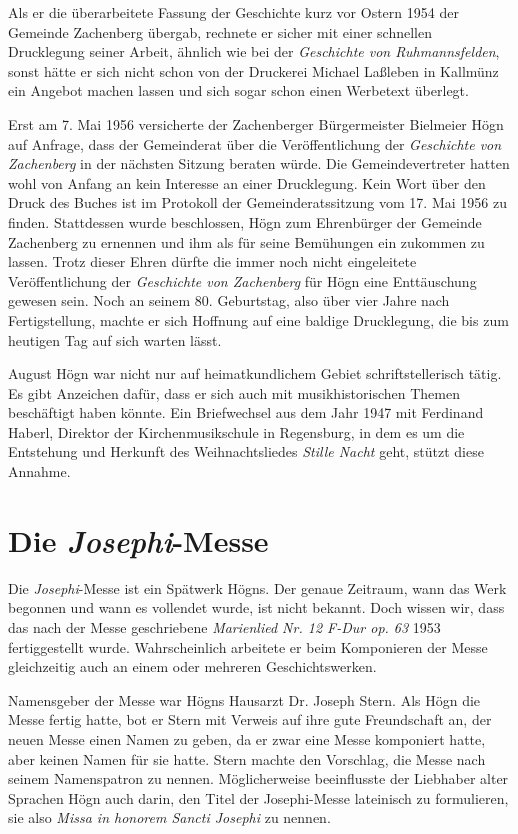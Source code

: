 Als er die überarbeitete Fassung der Geschichte kurz vor Ostern 1954 der
Gemeinde Zachenberg übergab, rechnete er sicher mit einer schnellen
Drucklegung seiner Arbeit, ähnlich wie bei der \textit{Geschichte von
Ruhmannsfelden}, sonst hätte er sich nicht schon von der Druckerei
Michael Laßleben in Kallmünz ein Angebot machen lassen und sich sogar
schon einen Werbetext überlegt.

Erst am 7. Mai 1956 versicherte der Zachenberger Bürgermeister Bielmeier
Högn auf Anfrage, dass der Gemeinderat über die Veröffentlichung der
\textit{Geschichte von Zachenberg} in der nächsten Sitzung beraten
würde. Die Gemeindevertreter hatten wohl von Anfang an kein Interesse
an einer Drucklegung. Kein Wort über den Druck des Buches ist im
Protokoll der Gemeinderatssitzung vom 17. Mai 1956 zu finden.
Stattdessen wurde beschlossen, Högn zum Ehrenbürger der Gemeinde
Zachenberg zu ernennen und ihm als für seine Bemühungen ein  zukommen zu lassen. Trotz dieser Ehren dürfte die
immer noch nicht eingeleitete Veröffentlichung der \textit{Geschichte
von Zachenberg} für Högn eine Enttäuschung gewesen sein. Noch an
seinem 80. Geburtstag, also über vier Jahre nach Fertigstellung, machte
er sich Hoffnung auf eine baldige Drucklegung, die bis zum heutigen Tag
auf sich warten lässt.

August Högn war nicht nur auf heimatkundlichem Gebiet schriftstellerisch
tätig. Es gibt Anzeichen dafür, dass er sich auch mit musikhistorischen
Themen beschäftigt haben könnte. Ein Briefwechsel aus dem Jahr 1947
mit Ferdinand Haberl, Direktor der Kirchenmusikschule in Regensburg,
in dem es um die Entstehung und Herkunft des Weihnachtsliedes
\textit{Stille Nacht} geht, stützt diese Annahme.

\section{Die \textit{Josephi}{}-Messe}

Die \textit{Josephi}{}-Messe ist ein Spätwerk Högns. Der genaue
Zeitraum, wann das Werk begonnen und wann es vollendet wurde, ist nicht
bekannt. Doch wissen wir, dass das nach der Messe geschriebene
\textit{Marienlied Nr. 12 F-Dur op. 63} 1953 fertiggestellt wurde.
Wahrscheinlich arbeitete er beim Komponieren der Messe gleichzeitig
auch an einem oder mehreren Geschichtswerken.

Namensgeber der Messe war Högns Hausarzt Dr. Joseph Stern. Als Högn die
Messe fertig hatte, bot er Stern mit Verweis auf ihre gute Freundschaft
an, der neuen Messe einen Namen zu geben, da er zwar eine Messe
komponiert hatte, aber keinen Namen für sie hatte. Stern machte den
Vorschlag, die Messe nach seinem Namenspatron zu nennen. Möglicherweise
beeinflusste der Liebhaber alter Sprachen Högn auch darin, den Titel
der Josephi-Messe lateinisch zu formulieren, sie also \textit{Missa in
honorem Sancti Josephi} zu nennen.

